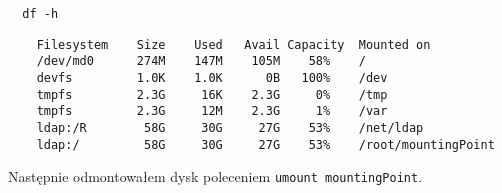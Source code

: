 \documentclass{article} %
\begin{document}
\begin{tcolorbox}[colback=yellow!10!white,colframe=red!45!black,coltitle=yellow!100!black, title=FreeBSD]
  \begin{lstlisting}
  df -h
  \end{lstlisting}
  \tcblower
  \tiny
  \begin{lstlisting}
    Filesystem    Size    Used   Avail Capacity  Mounted on
    /dev/md0      274M    147M    105M    58%    /
    devfs         1.0K    1.0K      0B   100%    /dev
    tmpfs         2.3G     16K    2.3G     0%    /tmp
    tmpfs         2.3G     12M    2.3G     1%    /var
    ldap:/R        58G     30G     27G    53%    /net/ldap
    ldap:/         58G     30G     27G    53%    /root/mountingPoint 
  \end{lstlisting}
\end{tcolorbox}
\normalsize

Następnie odmontowałem dysk poleceniem \texttt{umount mountingPoint}.
\end{document}
